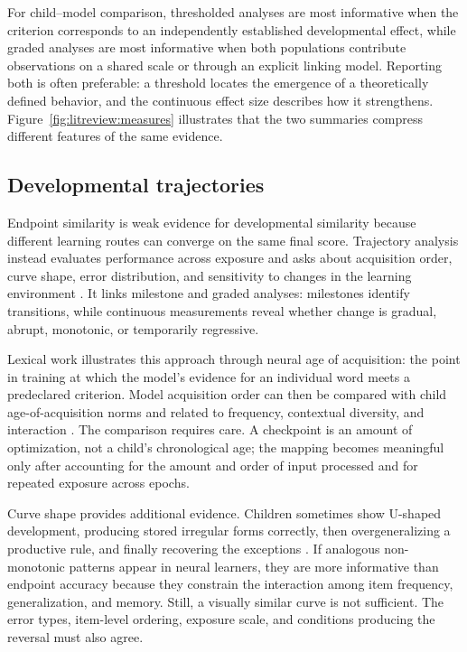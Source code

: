 For child--model comparison, thresholded analyses are most informative when the criterion corresponds to an independently established developmental effect, while graded analyses are most informative when both populations contribute observations on a shared scale or through an explicit linking model. Reporting both is often preferable: a threshold locates the emergence of a theoretically defined behavior, and the continuous effect size describes how it strengthens. Figure~\ref{fig:litreview:measures} illustrates that the two summaries compress different features of the same evidence.

\subsection{Developmental trajectories}
\label{sec:litreview:trajectories}

Endpoint similarity is weak evidence for developmental similarity because different learning routes can converge on the same final score. Trajectory analysis instead evaluates performance across exposure and asks about acquisition order, curve shape, error distribution, and sensitivity to changes in the learning environment \citep{chang2022word,evanson2023language,ma2025babysit}. It links milestone and graded analyses: milestones identify transitions, while continuous measurements reveal whether change is gradual, abrupt, monotonic, or temporarily regressive.

Lexical work illustrates this approach through neural age of acquisition: the point in training at which the model's evidence for an individual word meets a predeclared criterion. Model acquisition order can then be compared with child age-of-acquisition norms and related to frequency, contextual diversity, and interaction \citep{chang2022word,ma2025babysit}. The comparison requires care. A checkpoint is an amount of optimization, not a child's chronological age; the mapping becomes meaningful only after accounting for the amount and order of input processed and for repeated exposure across epochs.

Curve shape provides additional evidence. Children sometimes show U-shaped development, producing stored irregular forms correctly, then overgeneralizing a productive rule, and finally recovering the exceptions \citep{marcus_overregularization_1992}. If analogous non-monotonic patterns appear in neural learners, they are more informative than endpoint accuracy because they constrain the interaction among item frequency, generalization, and memory. Still, a visually similar curve is not sufficient. The error types, item-level ordering, exposure scale, and conditions producing the reversal must also agree.

